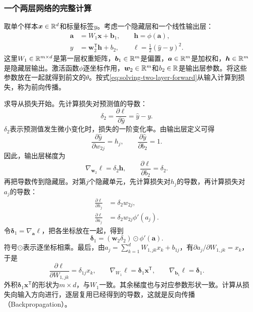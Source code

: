 \subsubsection{一个两层网络的完整计算}
取单个样本$\bm x\in\mathbb{R}^d$和标量标签$y$。考虑一个隐藏层和一个线性输出层：
\begin{align}
 \bm a&=W_1\bm x+\bm b_1,\qquad \bm h=\phi(\bm a),\\
 \hat y&=\bm w_2^{\mathsf T}\bm h+b_2,\qquad
 \ell=\frac12(\hat y-y)^2.
 \label{eq:solving-two-layer-forward}
\end{align}
这里$W_1\in\mathbb{R}^{m\times d}$是第一层权重矩阵，$\bm b_1\in\mathbb{R}^m$是偏置，$\bm a\in\mathbb{R}^m$是加权和，$\bm h\in\mathbb{R}^m$是隐藏层输出。激活函数$\phi$逐坐标作用，$\bm w_2\in\mathbb{R}^m$和$b_2\in\mathbb{R}$是输出层参数。将这些参数放在一起就得到前文的$\theta$。按式\eqref{eq:solving-two-layer-forward}从输入计算到损失，称为前向传播。

求导从损失开始。先计算损失对预测值的导数：
\begin{equation}
 \delta_2=\frac{\partial\ell}{\partial\hat y}=\hat y-y.
\end{equation}
$\delta_2$表示预测值发生微小变化时，损失的一阶变化率。由输出层定义可得
\[
\frac{\partial\hat y}{\partial w_{2j}}=h_j,
\qquad
\frac{\partial\hat y}{\partial b_2}=1.
\]
因此，输出层梯度为
\begin{equation}
 \nabla_{\bm w_2}\ell=\delta_2\bm h,\qquad
 \frac{\partial\ell}{\partial b_2}=\delta_2.
\end{equation}
再把导数传到隐藏层。对第$j$个隐藏单元，先计算损失对$h_j$的导数，再计算损失对$a_j$的导数：
\begin{align}
 \frac{\partial\ell}{\partial h_j}&=\delta_2w_{2j},\\
 \frac{\partial\ell}{\partial a_j}&=\delta_2w_{2j}\phi'(a_j).
\end{align}
令$\bm\delta_1=\nabla_{\bm a}\ell$，把各坐标放在一起，得到
\begin{equation}
 \bm\delta_1=(\bm w_2\delta_2)\odot\phi'(\bm a).
\end{equation}
符号$\odot$表示逐坐标相乘。最后，由$a_j=\sum_{k=1}^d W_{1,jk}x_k+b_{1j}$，有$\partial a_j/\partial W_{1,jk}=x_k$，于是
\begin{equation}
 \frac{\partial\ell}{\partial W_{1,jk}}=\delta_{1j}x_k,\qquad
 \nabla_{W_1}\ell=\bm\delta_1\bm x^{\mathsf T},\qquad
 \nabla_{\bm b_1}\ell=\bm\delta_1.
 \label{eq:solving-two-layer-backward}
\end{equation}
外积$\bm\delta_1\bm x^{\mathsf T}$的形状为$m\times d$，与$W_1$一致。其余梯度也与对应参数形状一致。计算从损失向输入方向进行，逐层复用已经得到的导数，这就是反向传播（Backpropagation）。

